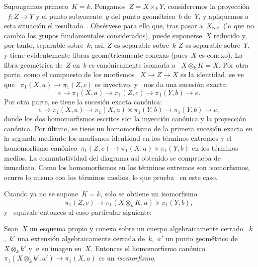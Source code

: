 Supongamos primero~$K=k$. Pongamos~$Z=X\times_k Y$, consideremos la proyección
~$f\colon Z\to Y$ y el punto subyacente~$y$ del punto geométrico~$b$ de~$Y$,
y apliquemos a esta situación el resultado~. Obsérvese para ello
que, tras pasar a~$X_{\mathrm{red}}$ (lo que no cambia los grupos fundamentales
considerados), puede suponerse~$X$ reducido y, por tanto, separable sobre~$k$;
así,
{$Z$ es separable sobre~$k$}
{$Z$ es separable sobre~$Y$},
y tiene evidentemente fibras geométricamente conexas (pues~$X$ es conexo). La
fibra geométrica de~$Z$ en~$b$ es canónicamente isomorfa a
~$X\otimes_k K=X$. Por otra parte, como el compuesto de los morfismos
~$X\to Z\to X$ es la identidad, se ve que
~$\pi_1(X,a)\to \pi_1(Z,c)$ es inyectivo, y~ nos da una sucesión
exacta:
$$
e\to \pi_1(X,a)\to \pi_1(Z,c)\to \pi_1(Y,b)\to e.
$$
Por otra parte, se tiene la sucesión exacta canónica:
$$
e\to \pi_1(X,a)\to \pi_1(X,a)\times \pi_1(Y,b)\to \pi_1(Y,b)\to e,
$$
donde los dos homomorfismos escritos son la inyección canónica y la proyección
canónica. Por último, se tiene un homomorfismo de la primera sucesión exacta en
la segunda mediante los morfismos identidad en los términos extremos y el
homomorfismo canónico~$\pi_1(Z,c)\to \pi_1(X,a)\times\pi_1(Y,b)$ en los
términos medios. La conmutatividad del diagrama así obtenido se comprueba de
inmediato. Como los homomorfismos en los términos extremos son isomorfismos,
ocurre lo mismo con los términos medios, lo que prueba~ en este
caso.

Cuando ya no se supone~$K=k$, solo se obtiene un isomorfismo
$$
\pi_1(Z,c)\to \pi_1(X\otimes_k K,a)\times \pi_1(Y,b),
$$
%
y~ equivale entonces al caso particular siguiente:

\begin{corollaire}
\label{X.1.8}
Sean~$X$ un esquema propio y conexo sobre un cuerpo algebraicamente cerrado
~$k$,~$k'$ una extensión algebraicamente cerrada de~$k$,~$a'$ un punto
geométrico de~$X\otimes_k k'$ y~$a$ su imagen en~$X$. Entonces el
homomorfismo canónico~$\pi_1(X\otimes_k k',a')\to \pi_1(X,a)$ es un
\emph{isomorfismo}.
\end{corollaire}

